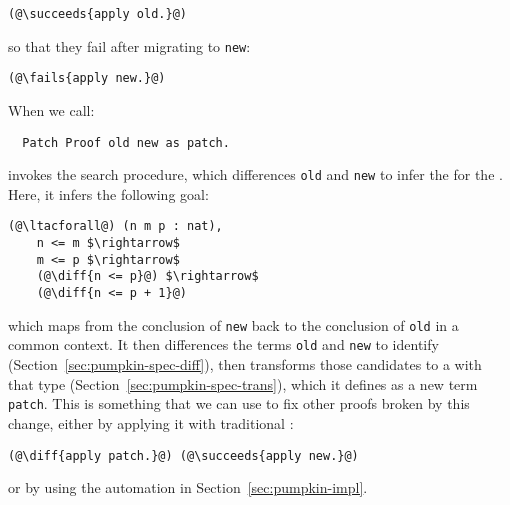 \begin{lstlisting}[language=coq]
  (@\succeeds{apply old.}@)
\end{lstlisting}
so that they fail after migrating to \lstinline{new}:

\begin{lstlisting}[language=coq]
  (@\fails{apply new.}@)
\end{lstlisting}
When we call:

\begin{lstlisting}
  Patch Proof old new as patch.
\end{lstlisting}
\sysname invokes the search procedure, which differences \lstinline{old} and \lstinline{new} to infer the  for the .
Here, it infers the following goal:

\begin{lstlisting}[language=coq]
  (@\ltacforall@) (n m p : nat),
    n <= m $\rightarrow$
    m <= p $\rightarrow$
    (@\diff{n <= p}@) $\rightarrow$
    (@\diff{n <= p + 1}@)
\end{lstlisting}
which maps from the conclusion of \lstinline{new} back to the conclusion of \lstinline{old} in a common context.
It then differences the terms \lstinline{old} and \lstinline{new} to identify  (Section~\ref{sec:pumpkin-spec-diff}),
then transforms those candidates to a  with that type (Section~\ref{sec:pumpkin-spec-trans}),
which it defines as a new term \lstinline{patch}.
This is something that we can use to fix other proofs broken by this change, either by applying it with traditional :

\begin{lstlisting}[language=coq]
  (@\diff{apply patch.}@) (@\succeeds{apply new.}@)
\end{lstlisting}
or by using the automation in Section~\ref{sec:pumpkin-impl}.

